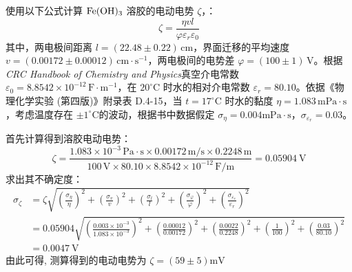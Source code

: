 使用以下公式计算 \(\ce{Fe(OH)3}\) 溶胶的电动电势 $\zeta$，：
$$
\zeta = \frac{\eta v l}{\varphi \varepsilon_r \varepsilon_0}
$$
其中，两电极间距离 $l = (22.48 \pm 0.22) \, \mathrm{cm}$，界面迁移的平均速度 $v = (0.00172 \pm 0.00012) \, \mathrm{cm} \cdot \mathrm{s}^{-1}$，两电极间的电势差 $\varphi = (100\pm 1) \, \mathrm{V}$。根据\textit{CRC Handbook of Chemistry and Physics}\cite{haynes2016crc}真空介电常数 $\varepsilon_0 = 8.8542 \times 10^{-12} \, \mathrm{F} \cdot \mathrm{m}^{-1}$，在 $20^\circ\mathrm{C}$ 时水的相对介电常数 $\varepsilon_r = 80.10$。依据《物理化学实验 (第四版)》附录表 D.4-15\cite{pku2002physicalchem}，当 $t = 17^\circ\mathrm{C}$ 时水的黏度 $\eta = 1.083 \, \mathrm{mPa} \cdot \mathrm{s}$，考虑温度存在 $\pm 1^\circ\mathrm{C}$的波动，根据书中数据假定 $\sigma_\eta=0.004 \mathrm{mPa} \cdot \mathrm{s}$，$\sigma_{\varepsilon_r}=0.03$。

首先计算得到溶胶电动电势：
$$
\zeta = \frac{1.083 \times 10^{-3} \, \mathrm{Pa} \cdot \mathrm{s} \times 0.00172 \, \mathrm{m/s} \times 0.2248 \, \mathrm{m}}{100 \, \mathrm{V} \times 80.10 \times 8.8542 \times 10^{-12} \, \mathrm{F/m}} = 0.05904\mathrm{~V}
$$
求出其不确定度：
$$
\begin{aligned}
\sigma_{\zeta} 
& = \zeta \sqrt{\left(\frac{\sigma_\eta}{\eta}\right)^2+\left(\frac{\sigma_v}{v}\right)^2+\left(\frac{\sigma_l}{l}\right)^2+\left(\frac{\sigma_{\varphi}}{\varphi}\right)^2+\left(\frac{\sigma_{\varepsilon_r}}{\varepsilon_r}\right)^2} \\
& = 0.05904 \sqrt{\left(\frac{0.003 \times 10^{-3}}{1.083 \times 10^{-3}}\right)^2 + \left(\frac{0.00012}{0.00172}\right)^2 + \left(\frac{0.0022}{0.2248}\right)^2 + \left(\frac{1}{100}\right)^2 + \left(\frac{0.03}{80.10}\right)^2}\\
& = 0.0047\mathrm{~V}
\end{aligned}
$$
由此可得, 测算得到的电动电势为 $\zeta=(59 \pm 5) \mathrm{mV}$




















